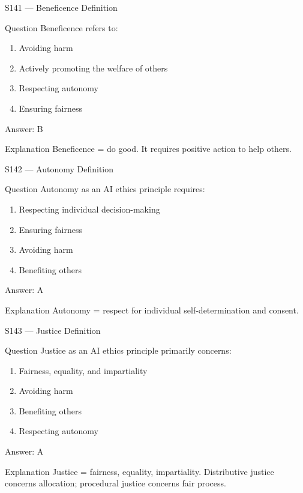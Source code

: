 \documentclass[aspectratio=169,8pt]{beamer}
\begin{document}
	\begin{frame}{S141 --- Beneficence Definition}
		\begin{block}{Question}
			Beneficence refers to:
			\begin{enumerate}
				\item Avoiding harm
				\item Actively promoting the welfare of others
				\item Respecting autonomy
				\item Ensuring fairness
			\end{enumerate}
		\end{block}
		\begin{exampleblock}{Answer: B}\end{exampleblock}
		\begin{block}{Explanation}
			Beneficence = do good. It requires positive action to help others.
		\end{block}
	\end{frame}
	
	\begin{frame}{S142 --- Autonomy Definition}
		\begin{block}{Question}
			Autonomy as an AI ethics principle requires:
			\begin{enumerate}
				\item Respecting individual decision-making
				\item Ensuring fairness
				\item Avoiding harm
				\item Benefiting others
			\end{enumerate}
		\end{block}
		\begin{exampleblock}{Answer: A}\end{exampleblock}
		\begin{block}{Explanation}
			Autonomy = respect for individual self-determination and consent.
		\end{block}
	\end{frame}
	
	\begin{frame}{S143 --- Justice Definition}
		\begin{block}{Question}
			Justice as an AI ethics principle primarily concerns:
			\begin{enumerate}
				\item Fairness, equality, and impartiality
				\item Avoiding harm
				\item Benefiting others
				\item Respecting autonomy
			\end{enumerate}
		\end{block}
		\begin{exampleblock}{Answer: A}\end{exampleblock}
		\begin{block}{Explanation}
			Justice = fairness, equality, impartiality. Distributive justice concerns allocation; procedural justice concerns fair process.
		\end{block}
	\end{frame}
	
\end{document}
